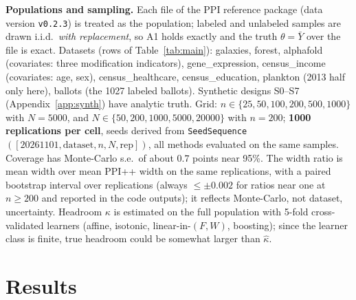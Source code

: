 \documentclass{article}
\begin{document}
\textbf{Populations and sampling.} Each file of the PPI reference package (data version \texttt{v0.2.3}) is treated as the population; labeled and unlabeled samples are drawn i.i.d.\ \emph{with replacement}, so A1 holds exactly and the truth $\theta=\bar Y$ over the file is exact. Datasets (rows of Table~\ref{tab:main}): galaxies, forest, alphafold (covariates: three modification indicators), gene\_expression, census\_income (covariates: age, sex), census\_healthcare, census\_education, plankton (2013 half only here), ballots (the 1027 labeled ballots). Synthetic designs S0--S7 (Appendix~\ref{app:synth}) have analytic truth. Grid: $n\in\{25,50,100,200,500,1000\}$ with $N=5000$, and $N\in\{50,200,1000,5000,20000\}$ with $n=200$; \textbf{1000 replications per cell}, seeds derived from \texttt{SeedSequence}$([20261101,\text{dataset},n,N,\text{rep}])$, all methods evaluated on the same samples. Coverage has Monte-Carlo s.e.\ of about $0.7$ points near 95\%. The width ratio is mean width over mean PPI++ width on the same replications, with a paired bootstrap interval over replications (always $\le\pm0.002$ for ratios near one at $n\ge200$ and reported in the code outputs); it reflects Monte-Carlo, not dataset, uncertainty. Headroom $\kappa$ is estimated on the full population with 5-fold cross-validated learners (affine, isotonic, linear-in-$(F,W)$, boosting); since the learner class is finite, true headroom could be somewhat larger than $\hat\kappa$.

\section{Results}
\end{document}
